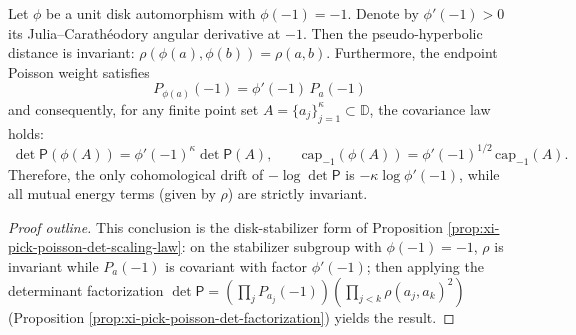 \begin{corollary}\label{cor:xi-anchored-capacity-stabilizer-covariance}
Let \(\phi\) be a unit disk automorphism with \(\phi(-1)=-1\).
Denote by \(\phi'(-1)>0\) its Julia--Carath\'eodory angular derivative at \(-1\).
Then the pseudo-hyperbolic distance is invariant: \(\rho(\phi(a),\phi(b))=\rho(a,b)\).
Furthermore, the endpoint Poisson weight satisfies
\[
\boxed{\;P_{\phi(a)}(-1)=\phi'(-1)\,P_a(-1)\;}
\]
and consequently, for any finite point set \(A=\{a_j\}_{j=1}^{\kappa}\subset\mathbb{D}\), the covariance law holds:
\[
\boxed{\;
\det\mathsf P(\phi(A))=\phi'(-1)^{\kappa}\det\mathsf P(A),\qquad
\mathrm{cap}_{-1}(\phi(A))=\phi'(-1)^{1/2}\,\mathrm{cap}_{-1}(A).\;}
\]
Therefore, the only cohomological drift of \(-\log\det\mathsf P\) is \(-\kappa\log\phi'(-1)\), while all mutual energy terms (given by \(\rho\)) are strictly invariant.
\end{corollary}
\begin{proof}[Proof outline]
This conclusion is the disk-stabilizer form of Proposition \ref{prop:xi-pick-poisson-det-scaling-law}: on the stabilizer subgroup with \(\phi(-1)=-1\),
\(\rho\) is invariant while \(P_a(-1)\) is covariant with factor \(\phi'(-1)\); then applying the determinant factorization
\(\det\mathsf P=(\prod_j P_{a_j}(-1))(\prod_{j<k}\rho(a_j,a_k)^2)\) (Proposition \ref{prop:xi-pick-poisson-det-factorization}) yields the result. \qedhere
\end{proof}

